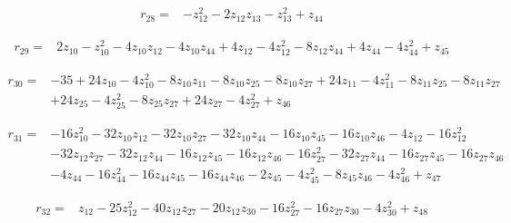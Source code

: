 \par\noindent\begin{minipage}{\linewidth}
\begin{align*}
r_{28}={}&-z_{12}^{2}-2z_{12}z_{13}-z_{13}^{2}+z_{44}
\end{align*}
\end{minipage}\par
\par\noindent\begin{minipage}{\linewidth}
\begin{align*}
r_{29}={}&2z_{10}-z_{10}^{2}-4z_{10}z_{12}-4z_{10}z_{44}+4z_{12}-4z_{12}^{2}-8z_{12}z_{44}+4z_{44}-4z_{44}^{2}+z_{45}
\end{align*}
\end{minipage}\par
\par\noindent\begin{minipage}{\linewidth}
\begin{align*}
r_{30}={}&-35+24z_{10}-4z_{10}^{2}-8z_{10}z_{11}-8z_{10}z_{25}-8z_{10}z_{27}+24z_{11}-4z_{11}^{2}-8z_{11}z_{25}-8z_{11}z_{27}\\[-2pt]
&+24z_{25}-4z_{25}^{2}-8z_{25}z_{27}+24z_{27}-4z_{27}^{2}+z_{46}
\end{align*}
\end{minipage}\par
\par\noindent\begin{minipage}{\linewidth}
\begin{align*}
r_{31}={}&-16z_{10}^{2}-32z_{10}z_{12}-32z_{10}z_{27}-32z_{10}z_{44}-16z_{10}z_{45}-16z_{10}z_{46}-4z_{12}-16z_{12}^{2}\\[-2pt]
&-32z_{12}z_{27}-32z_{12}z_{44}-16z_{12}z_{45}-16z_{12}z_{46}-16z_{27}^{2}-32z_{27}z_{44}-16z_{27}z_{45}-16z_{27}z_{46}\\[-2pt]
&-4z_{44}-16z_{44}^{2}-16z_{44}z_{45}-16z_{44}z_{46}-2z_{45}-4z_{45}^{2}-8z_{45}z_{46}-4z_{46}^{2}+z_{47}
\end{align*}
\end{minipage}\par
\par\noindent\begin{minipage}{\linewidth}
\begin{align*}
r_{32}={}&z_{12}-25z_{12}^{2}-40z_{12}z_{27}-20z_{12}z_{30}-16z_{27}^{2}-16z_{27}z_{30}-4z_{30}^{2}+z_{48}
\end{align*}
\end{minipage}\par
